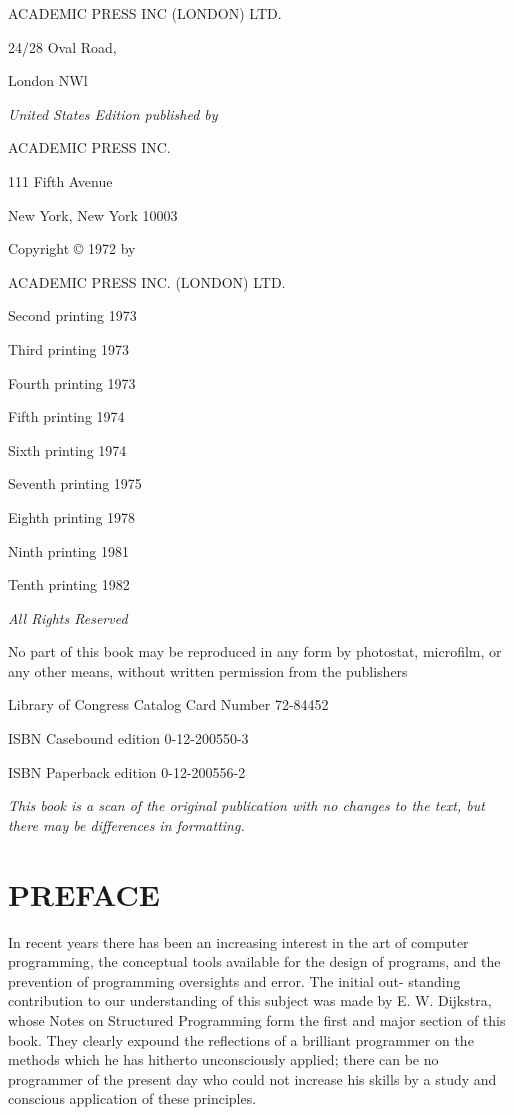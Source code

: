 \documentclass[twoside,11pt]{book}
\begin{document}
\begin{center}
	\small
	ACADEMIC PRESS INC (LONDON) LTD.
	
	24/28 Oval Road,
	
	London NWl
	\bigskip
	
	\textit{United States Edition published by}
	
	ACADEMIC PRESS INC.
	
	111 Fifth Avenue
	
	New York, New York 10003
	\vfill
	
	Copyright © 1972 by
	
	ACADEMIC PRESS INC. (LONDON) LTD.
	\vfill
	
	Second printing 1973
	
	Third printing 1973
	
	Fourth printing 1973
	
	Fifth printing 1974
	
	Sixth printing 1974
	
	Seventh printing 1975
	
	Eighth printing 1978
	
	Ninth printing 1981
	
	Tenth printing 1982
	\vfill
	
	\textit{All Rights Reserved}
		
	No part of this book may be reproduced in any form by photostat, microfilm, or any other means, without written permission from the publishers
	\vfill
	
	Library of Congress Catalog Card Number 72-84452
	
	ISBN Casebound edition 0-12-200550-3
	
	ISBN Paperback edition 0-12-200556-2
	\bigskip
	
	\textit{This book is a scan of the original publication with no changes to the text, but there may be differences in formatting.}

\end{center}
\clearpage

\cleardoublepage
\clearpage
\chapter*{PREFACE}
%

\noindent
In recent years there has been an increasing interest in the art of computer programming, the conceptual tools available for the design of programs, and the prevention of programming oversights and error. The initial out- standing contribution to our understanding of this subject was made by E. W. Dijkstra, whose Notes on Structured Programming form the first and major section of this book. They clearly expound the reflections of a brilliant programmer on the methods which he has hitherto unconsciously applied; there can be no programmer of the present day who could not increase his skills by a study and conscious application of these principles.
\end{document}
